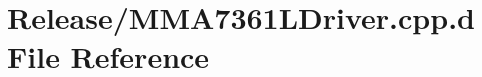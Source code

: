 \hypertarget{_release_2_m_m_a7361_l_driver_8cpp_8d}{\section{\-Release/\-M\-M\-A7361\-L\-Driver.cpp.\-d \-File \-Reference}
\label{_release_2_m_m_a7361_l_driver_8cpp_8d}
}
